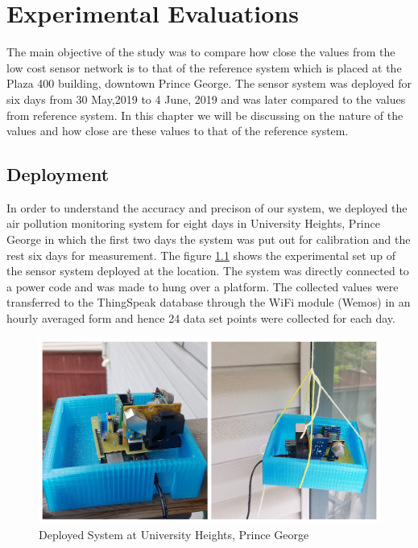 \chapter{Experimental Evaluations}

The main objective of the study was to compare how close the values from the low cost sensor network is to that of the reference system which is placed at the Plaza 400 building, downtown Prince George. The sensor system was deployed for six days from 30 May,2019 to 4 June, 2019 and was later compared to the values from reference system. In this chapter we will be discussing on the nature of the values and how close are these values to that of the reference system.

\section{Deployment}

In order to understand the accuracy and precison of our system, we deployed the air pollution monitoring system for eight days in University Heights, Prince George in which the first two days the system was put out for calibration and the rest six days for measurement. The figure \ref{deployed} shows the experimental set up of the sensor system deployed at the location. The system was directly connected to a power code and was made to hung over a platform. The collected values were transferred to the ThingSpeak database through the WiFi module (Wemos) in an hourly averaged form and hence 24 data set points were collected for each day.

\begin{figure}[h]
    \begin{center}
    \includegraphics[scale=0.5]{images/figure20.jpg}
    \end{center}
    \caption{Deployed System at University Heights, Prince George}
    \label{deployed}

  \end{figure} 


